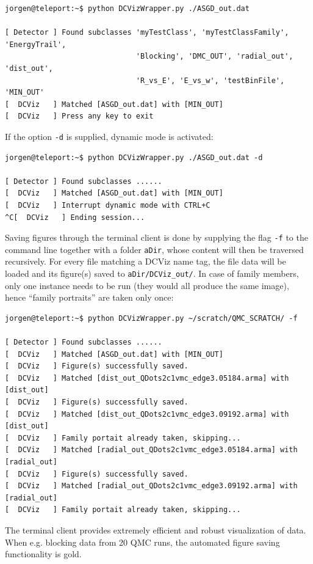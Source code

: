 \begin{verbatim}
jorgen@teleport:~$ python DCVizWrapper.py ./ASGD_out.dat 

[ Detector ] Found subclasses 'myTestClass', 'myTestClassFamily', 'EnergyTrail', 
                              'Blocking', 'DMC_OUT', 'radial_out', 'dist_out', 
                              'R_vs_E', 'E_vs_w', 'testBinFile', 'MIN_OUT'
[  DCViz   ] Matched [ASGD_out.dat] with [MIN_OUT]
[  DCViz   ] Press any key to exit
\end{verbatim}

If the option \verb+-d+ is supplied, dynamic mode is activated:

\begin{verbatim}
jorgen@teleport:~$ python DCVizWrapper.py ./ASGD_out.dat -d

[ Detector ] Found subclasses ......
[  DCViz   ] Matched [ASGD_out.dat] with [MIN_OUT]
[  DCViz   ] Interrupt dynamic mode with CTRL+C
^C[  DCViz   ] Ending session...
\end{verbatim}

Saving figures through the terminal client is done by supplying the flag \verb+-f+ to the command line together with a folder \verb+aDir+, whose content will then be traversed recursively. For every file matching a DCViz name tag, the file data will be loaded and its figure(s) saved to \verb+aDir/DCViz_out/+. In case of family members, only one instance needs to be run (they would all produce the same image), hence ``family portraits'' are taken only once:

\begin{verbatim}
jorgen@teleport:~$ python DCVizWrapper.py ~/scratch/QMC_SCRATCH/ -f

[ Detector ] Found subclasses ......
[  DCViz   ] Matched [ASGD_out.dat] with [MIN_OUT]
[  DCViz   ] Figure(s) successfully saved.
[  DCViz   ] Matched [dist_out_QDots2c1vmc_edge3.05184.arma] with [dist_out]
[  DCViz   ] Figure(s) successfully saved.
[  DCViz   ] Matched [dist_out_QDots2c1vmc_edge3.09192.arma] with [dist_out]
[  DCViz   ] Family portait already taken, skipping...
[  DCViz   ] Matched [radial_out_QDots2c1vmc_edge3.05184.arma] with [radial_out]
[  DCViz   ] Figure(s) successfully saved.
[  DCViz   ] Matched [radial_out_QDots2c1vmc_edge3.09192.arma] with [radial_out]
[  DCViz   ] Family portait already taken, skipping...
\end{verbatim}

The terminal client provides extremely efficient and robust visualization of data. When e.g. blocking data from 20 QMC runs, the automated figure saving functionality is gold.  

